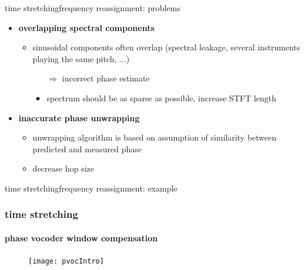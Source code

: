         \begin{frame}{time stretching}{frequency reassignment: problems}
                \begin{itemize}
                    \item   \textbf{overlapping spectral components}
                        \begin{itemize}
                            \item   sinusoidal components often overlap (spectral leakage, several instruments playing the same pitch, ...)
                                \begin{itemize}
                                    \item[$\Rightarrow$] incorrect phase estimate
                                    \bigskip
                                    \item<2-> spectrum should be as sparse as possible, increase STFT length
                                \end{itemize}
                        \end{itemize}
                    \item<3->   \textbf{inaccurate phase unwrapping} 
                        \begin{itemize}
                            \item   unwrapping algorithm is based on assumption of similarity between predicted and measured phase
                            \bigskip
                            \item<2-> decrease hop size
                        \end{itemize}
                \end{itemize}
        \end{frame}
        \begin{frame}{time stretching}{frequency reassignment: example}
        \end{frame}


    \begin{frame}\frametitle{time stretching}\framesubtitle{phase vocoder window compensation}
        \begin{figure}
            \centerline{\texttt{[image: pvocIntro]}}
        \end{figure}
    \end{frame}

